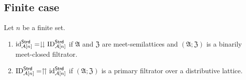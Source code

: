 \subsection{Finite case}
\begin{thm}
Let $n$ be a finite set.
\begin{enumerate}
\item \label{id-fin-down}$\operatorname{id}_{\mathcal{A}[n]}^{\mathsf{Strd}}=\downdownarrows\operatorname{ID}_{\mathcal{A}[n]}^{\mathsf{Strd}}$
if $\mathfrak{A}$ and $\mathfrak{Z}$ are meet-semilattices and $(\mathfrak{A};\mathfrak{Z})$
is a binarily meet-closed filtrator.
\item \label{id-fin-up}$\operatorname{ID}_{\mathcal{A}[n]}^{\mathsf{Strd}}=\upuparrows\operatorname{id}_{\mathcal{A}[n]}^{\mathsf{Strd}}$
if $(\mathfrak{A};\mathfrak{Z})$ is a primary filtrator over a distributive
lattice.
\end{enumerate}
\end{thm}
